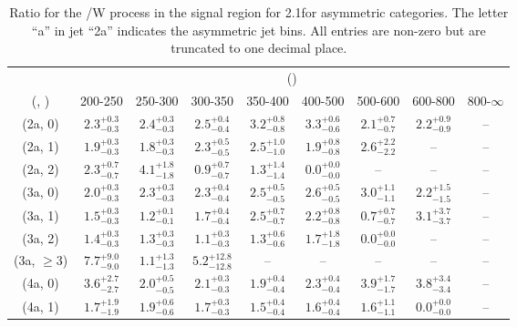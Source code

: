 \begin{table}[h!]
\tiny
\centering
\caption{Ratio for the \ttbar/W process in the signal region for 2.1\ifb for asymmetric categories. The letter ``a'' in jet \eg ``2a''  indicates the asymmetric jet bins. All entries are non-zero but are truncated to one decimal place.\label{tab:ratiosep_sig_ttw_asym}}
\begin{tabular}
{ccccccccc}
	\hline\hline
	& \multicolumn{8}{c}{\scalht (\gev)} \\ 
	 (\njet,  \nb) & 200-250 & 250-300 & 300-350 & 350-400 & 400-500 & 500-600 & 600-800 & 800-$\infty$ \\ [0.8ex] 
\hline
	(2a, 0) & $2.3^{+ 0.3 }_{- 0.3 }$ & $2.4^{+ 0.3 }_{- 0.3 }$ & $2.5^{+ 0.4 }_{- 0.4 }$ & $3.2^{+ 0.8 }_{- 0.8 }$ & $3.3^{+ 0.6 }_{- 0.6 }$ & $2.1^{+ 0.7 }_{- 0.7 }$ & $2.2^{+ 0.9 }_{- 0.9 }$ & -- \\[0.5ex] 
	(2a, 1) & $1.9^{+ 0.3 }_{- 0.3 }$ & $1.8^{+ 0.3 }_{- 0.3 }$ & $2.3^{+ 0.5 }_{- 0.5 }$ & $2.5^{+ 1.0 }_{- 1.0 }$ & $1.9^{+ 0.8 }_{- 0.8 }$ & $2.6^{+ 2.2 }_{- 2.2 }$ & -- & -- \\[0.5ex] 
	(2a, 2) & $2.3^{+ 0.7 }_{- 0.7 }$ & $4.1^{+ 1.8 }_{- 1.8 }$ & $0.9^{+ 0.7 }_{- 0.7 }$ & $1.3^{+ 1.4 }_{- 1.4 }$ & $0.0^{+ 0.0 }_{- 0.0 }$ & -- & -- & -- \\[0.5ex] 
	(3a, 0) & $2.0^{+ 0.3 }_{- 0.3 }$ & $2.3^{+ 0.3 }_{- 0.3 }$ & $2.3^{+ 0.4 }_{- 0.4 }$ & $2.5^{+ 0.5 }_{- 0.5 }$ & $2.6^{+ 0.5 }_{- 0.5 }$ & $3.0^{+ 1.1 }_{- 1.1 }$ & $2.2^{+ 1.5 }_{- 1.5 }$ & -- \\[0.5ex] 
	(3a, 1) & $1.5^{+ 0.3 }_{- 0.3 }$ & $1.2^{+ 0.1 }_{- 0.1 }$ & $1.7^{+ 0.4 }_{- 0.4 }$ & $2.5^{+ 0.7 }_{- 0.7 }$ & $2.2^{+ 0.8 }_{- 0.8 }$ & $0.7^{+ 0.7 }_{- 0.7 }$ & $3.1^{+ 3.7 }_{- 3.7 }$ & -- \\[0.5ex] 
	(3a, 2) & $1.4^{+ 0.3 }_{- 0.3 }$ & $1.3^{+ 0.3 }_{- 0.3 }$ & $1.1^{+ 0.3 }_{- 0.3 }$ & $1.3^{+ 0.6 }_{- 0.6 }$ & $1.7^{+ 1.8 }_{- 1.8 }$ & $0.0^{+ 0.0 }_{- 0.0 }$ & -- & -- \\[0.5ex] 
	(3a, $\ge3$) & $7.7^{+ 9.0 }_{- 9.0 }$ & $1.1^{+ 1.3 }_{- 1.3 }$ & $5.2^{+ 12.8 }_{- 12.8 }$ & -- & -- & -- & -- & -- \\[0.5ex] 
	(4a, 0) & $3.6^{+ 2.7 }_{- 2.7 }$ & $2.0^{+ 0.5 }_{- 0.5 }$ & $2.1^{+ 0.3 }_{- 0.3 }$ & $1.9^{+ 0.4 }_{- 0.4 }$ & $2.3^{+ 0.4 }_{- 0.4 }$ & $3.9^{+ 1.7 }_{- 1.7 }$ & $3.8^{+ 3.4 }_{- 3.4 }$ & -- \\[0.5ex] 
	(4a, 1) & $1.7^{+ 1.9 }_{- 1.9 }$ & $1.9^{+ 0.6 }_{- 0.6 }$ & $1.7^{+ 0.3 }_{- 0.3 }$ & $1.5^{+ 0.4 }_{- 0.4 }$ & $1.6^{+ 0.4 }_{- 0.4 }$ & $1.6^{+ 1.1 }_{- 1.1 }$ & $0.0^{+ 0.0 }_{- 0.0 }$ & -- \\[0.5ex] 

\end{tabular}
\end{table}
